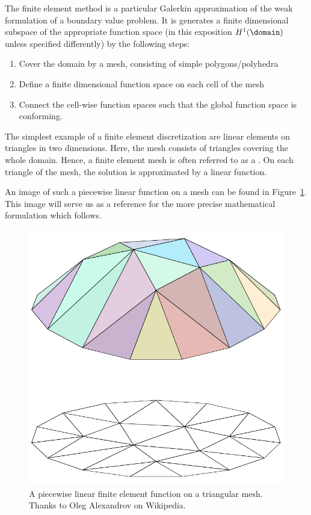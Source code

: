 \begin{intro}
  The finite element method is a particular Galerkin approximation of
  the weak formulation of a boundary value problem. It is generates a
  finite dimensional subspace of the appropriate function space (in
  this exposition $H^1(\domain)$ unless specified differently) by the
  following steps:
  \begin{enumerate}
  \item Cover the domain by a mesh, consisting of simple polygons/polyhedra
  \item Define a finite dimensional function space on each cell of the mesh
  \item Connect the cell-wise function spaces such that the global
    function space is conforming.
  \end{enumerate}
\end{intro}


\begin{example}
  The simplest example of a finite element discretization are linear
  elements on triangles in two dimensions. Here, the mesh consists of
  triangles covering the whole domain. Hence, a finite element mesh is
  often referred to as a . On each triangle of
  the mesh, the solution is approximated by a linear function.

  An image of such a piecewise linear function on a mesh can be found
  in Figure~\ref{fig:piecewise-linear}. This image will serve us as a
  reference for the more precise mathematical formulation which
  follows.
  \begin{figure}[tp]
    \centering
    \includegraphics[width=.5\textwidth]{fig/piecewise-linear-function}
    \caption{A piecewise linear finite element function on a
      triangular mesh. Thanks to Oleg Alexandrov on Wikipedia.}
    \label{fig:piecewise-linear}
  \end{figure}
\end{example}

